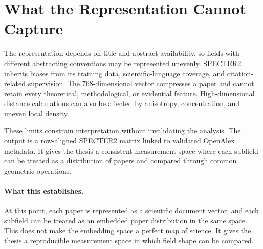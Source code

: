 \section{What the Representation Cannot Capture}

The representation depends on title and abstract availability, so fields with different abstracting conventions may be represented unevenly. SPECTER2 inherits biases from its training data, scientific-language coverage, and citation-related supervision. The 768-dimensional vector compresses a paper and cannot retain every theoretical, methodological, or evidential feature. High-dimensional distance calculations can also be affected by anisotropy, concentration, and uneven local density.

These limits constrain interpretation without invalidating the analysis. The output is a row-aligned SPECTER2 matrix linked to validated OpenAlex metadata. It gives the thesis a consistent measurement space where each subfield can be treated as a distribution of papers and compared through common geometric operations.

\paragraph{What this establishes.}
At this point, each paper is represented as a scientific document vector, and each subfield can be treated as an embedded paper distribution in the same space. This does not make the embedding space a perfect map of science. It gives the thesis a reproducible measurement space in which field shape can be compared.
